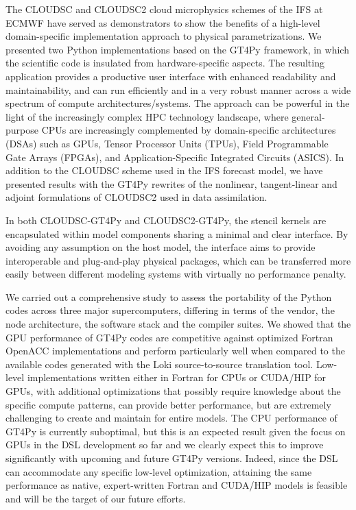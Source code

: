 \documentclass[gmd,manuscript,online]{copernicus}
\theoremstyle{theorem}
\theoremstyle{definition}
\theoremstyle{remark}
\theoremstyle{proposition}
\begin{document}
	The CLOUDSC and CLOUDSC2 cloud microphysics schemes of the IFS at ECMWF have served as demonstrators to show the benefits of a high-level domain-specific implementation approach to physical parametrizations. We presented two Python implementations based on the GT4Py framework, in which the scientific code is insulated from hardware-specific aspects. The resulting application provides a productive user interface with enhanced readability and maintainability, and can run efficiently and in a very robust manner across a wide spectrum of compute architectures/systems. The approach can be powerful in the light of the increasingly complex HPC technology landscape, where general-purpose CPUs are increasingly complemented by domain-specific architectures (DSAs) such as GPUs, Tensor Processor Units (TPUs), Field Programmable Gate Arrays (FPGAs), and Application-Specific Integrated Circuits (ASICS). In addition to the CLOUDSC scheme used in the IFS forecast model, we have presented results with the GT4Py rewrites of the nonlinear, tangent-linear and adjoint formulations of CLOUDSC2 used in data assimilation.

	In both CLOUDSC-GT4Py and CLOUDSC2-GT4Py, the stencil kernels are encapsulated within model components sharing a minimal and clear interface. By avoiding any assumption on the host model, the interface aims to provide interoperable and plug-and-play physical packages, which can be transferred more easily between different modeling systems with virtually no performance penalty.

	We carried out a comprehensive study to assess the portability of the Python codes across three major supercomputers, differing in terms of the vendor, the node architecture, the software stack and the compiler suites. We showed that the GPU performance of GT4Py codes are competitive against optimized Fortran OpenACC implementations and perform particularly well when compared to the available codes generated with the Loki source-to-source translation tool. Low-level implementations written either in Fortran for CPUs or CUDA/HIP for GPUs, with additional optimizations that possibly require knowledge about the specific compute patterns, can provide better performance, but are extremely challenging to create and maintain for entire models. The CPU performance of GT4Py is currently suboptimal, but this is an expected result given the focus on GPUs in the DSL development so far and we clearly expect this to improve significantly with upcoming and future GT4Py versions. Indeed, since the DSL can accommodate any specific low-level optimization, attaining the same performance as native, expert-written Fortran and CUDA/HIP models is feasible and will be the target of our future efforts.
\end{document}
